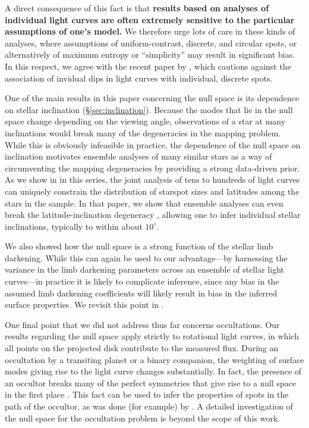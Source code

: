 \documentclass[modern]{aastex62}
\begin{document}
A direct consequence of this fact is that \textbf{results based on analyses
    of individual light curves are often extremely sensitive to
    the particular assumptions of one's model.} We therefore urge lots of care
in these kinds of analyses, where assumptions of uniform-contrast, discrete, and
circular spots, or alternatively of maximum entropy or ``simplicity'' may
result in significant bias. In this respect, we agree with the recent
paper by \citep{Basri2020}, which cautions against the association of
invidual dips in light curves with individual, discrete spots.

One of the main results in this paper concerning the null space is its
dependence on stellar inclination (\S\ref{sec:inclination}).
Because the modes that lie in the null
space change depending on the viewing angle, observations of a star at many
inclinations would break many of the degeneracies in the mapping problem. While
this is obviously infeasible in practice, the dependence of the null
space on inclination motivates ensemble analyses of many similar stars
as a way of circumventing the mapping degeneracies by
providing a strong data-driven prior. As we show in
 in this series, the joint analysis of tens to hundreds
of light curves can uniquely constrain the distribution of starspot
sizes and latitudes among the stars in the sample. In that paper,
we show that ensemble analyses can
even break the latitude-inclination degeneracy \citep[e.g.,][]{Walkowicz2013},
allowing one to infer individual stellar inclinations, typically to within
about $10^\circ$.

We also showed how the null space is a strong function of the stellar limb
darkening. While this can again be used to our advantage---by harnessing the
variance in the limb darkening parameters across an ensemble of stellar
light curves---in practice it is likely to complicate inference, since
any bias in the assumed limb darkening coefficients will likely result in
bias in the inferred surface properties. We revisit this point in
.

One final point that we did not address thus far concerns occultations.
Our results regarding the null space apply strictly to rotational light curves,
in which all points on the projected disk contribute to the measured flux.
During an occultation by a transiting planet or a binary companion, the
weighting of surface modes giving rise to the light curve changes
substantially. In fact, the presence of an occultor breaks many of the perfect
symmetries that give rise to a null space in the first place
\citep[e.g.,][]{Luger2019}. This fact can be used to infer the properties
of spots in the path of the occultor, as was done (for example)
by \citet[e.g.,][]{Morris2017}. A detailed investigation of the null space
for the occultation problem is beyond the scope of this work.
\end{document}
